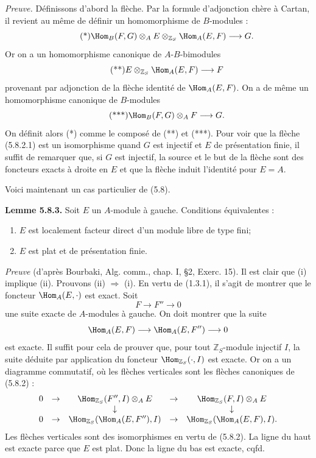 \documentclass[11pt]{article}
\begin{document}
\emph{Preuve.} Définissons d'abord la flèche. Par la formule d'adjonction chère à Cartan, il revient au même de définir un homomorphisme de \(B\)-modules :
\begin{equation}\tag{*}
  \Hom_B(F,G)\otimes_A E\otimes_{\mathbb Z_S}\Hom_A(E,F)
  \longrightarrow G.
\end{equation}
Or on a un homomorphisme canonique de \(A\)-\(B\)-bimodules
\begin{equation}\tag{**}
  E\otimes_{\mathbb Z_S}\Hom_A(E,F)
  \longrightarrow F
\end{equation}
provenant par adjonction de la flèche identité de \(\Hom_A(E,F)\). On a de même un homomorphisme canonique de \(B\)-modules
\begin{equation}\tag{***}
  \Hom_B(F,G)\otimes_A F\longrightarrow G.
\end{equation}
On définit alors (*) comme le composé de (**) et (***). Pour voir que la flèche (5.8.2.1) est un isomorphisme quand \(G\) est injectif et \(E\) de présentation finie, il suffit de remarquer que, si \(G\) est injectif, la source et le but de la flèche sont des foncteurs exacts à droite en \(E\) et que la flèche induit l'identité pour \(E=A\).

Voici maintenant un cas particulier de (5.8).

\textbf{Lemme 5.8.3.} Soit \(E\) un \(A\)-module à gauche. Conditions équivalentes :
\begin{enumerate}[label=(\roman*)]
\item \(E\) est localement facteur direct d'un module libre de type fini;
\item \(E\) est plat et de présentation finie.
\end{enumerate}

\emph{Preuve} (d'après Bourbaki, Alg. comm., chap. I, §2, Exerc. 15). Il est clair que (i) implique (ii). Prouvons (ii) \(\Rightarrow\) (i). En vertu de (1.3.1), il s'agit de montrer que le foncteur \(\Hom_A(E,\cdot)\) est exact. Soit
\[
  F\longrightarrow F''\longrightarrow 0
\]
une suite exacte de \(A\)-modules à gauche. On doit montrer que la suite
\[
  \Hom_A(E,F)\longrightarrow \Hom_A(E,F'')\longrightarrow 0
\]
est exacte. Il suffit pour cela de prouver que, pour tout \(\mathbb Z_S\)-module injectif \(I\), la suite déduite par application du foncteur \(\Hom_{\mathbb Z_S}(\cdot,I)\) est exacte. Or on a un diagramme commutatif, où les flèches verticales sont les flèches canoniques de (5.8.2) :
\[
\begin{array}{ccccccccc}
0&\to&\Hom_{\mathbb Z_S}(F'',I)\otimes_A E&\to&\Hom_{\mathbb Z_S}(F,I)\otimes_A E\\
&&\downarrow&&\downarrow\\
0&\to&\Hom_{\mathbb Z_S}(\Hom_A(E,F''),I)&\to&\Hom_{\mathbb Z_S}(\Hom_A(E,F),I).
\end{array}
\]
Les flèches verticales sont des isomorphismes en vertu de (5.8.2). La ligne du haut est exacte parce que \(E\) est plat. Donc la ligne du bas est exacte, cqfd.
\end{document}
